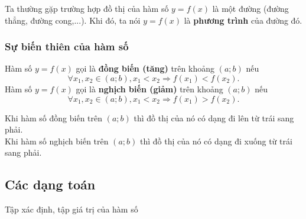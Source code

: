 Ta thường gặp trường hợp đồ thị của hàm số $y=f(x)$ là một đường (đường thẳng, đường cong,...). Khi đó, ta nói $y=f(x)$ là \textbf{phương trình} của đường đó.

\subsubsection{Sự biến thiên của hàm số}

\begin{dn}{}
	Hàm số $y=f(x)$ gọi là \textbf{đồng biến (tăng)} trên khoảng $(a;b)$ nếu 
	$$\forall x_1, x_2\in (a;b), x_1 < x_2 \Rightarrow f(x_1) < f(x_2).$$
	Hàm số $y=f(x)$ gọi là \textbf{nghịch biến (giảm)} trên khoảng $(a;b)$ nếu 
	$$\forall x_1, x_2\in (a;b), x_1 < x_2 \Rightarrow f(x_1) > f(x_2).$$
\end{dn}


\begin{note}
	Khi hàm số đồng biến trên $(a;b)$ thì đồ thị của nó có dạng đi lên từ trái sang phải.\\
	Khi hàm số nghịch biến trên $(a;b)$ thì đồ thị của nó có dạng đi xuống từ trái sang phải.
\end{note}

\subsection{Các dạng toán}

\begin{dang}{Tập xác định, tập giá trị của hàm số}
\end{dang}

\viduminhhoa

